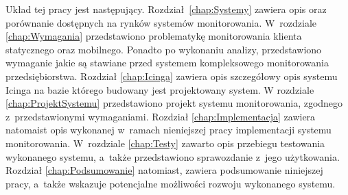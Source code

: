 Układ tej pracy jest następujący. Rozdział~\ref{chap:Systemy} zawiera
opis oraz porównanie dostępnych na rynków systemów
monitorowania. W~rozdziale \ref{chap:Wymagania} przedstawiono
problematykę monitorowania klienta statycznego oraz mobilnego. Ponadto
po wykonaniu analizy, przedstawiono wymaganie jakie są stawiane przed
systemem kompleksowego monitorowania przedsiębiorstwa. Rozdział
\ref{chap:Icinga} zawiera opis szczegółowy opis systemu Icinga na
bazie którego budowany jest projektowany system. W rozdziale
\ref{chap:ProjektSystemu} przedstawiono projekt systemu monitorowania,
zgodnego z~przedstawionymi wymaganiami. Rozdział
\ref{chap:Implementacja} zawiera natomaist opis wykonanej w~ramach
nieniejszej pracy implementacji systemu monitorowania. W~rozdziale
\ref{chap:Testy} zawarto opis przebiegu testowania wykonanego systemu,
a~także przedstawiono sprawozdanie z~jego użytkowania. Rozdział
\ref{chap:Podsumowanie} natomiast, zawiera podsumowanie niniejszej
pracy, a~także wskazuje potencjalne możliwości rozwoju wykonanego
systemu.
